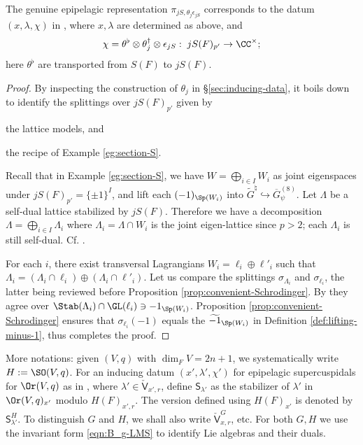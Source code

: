 \documentclass[a4paper,10pt]{article}
\begin{document}
\begin{lemma}\label{prop:chi-formula}
	The genuine epipelagic representation $\pi_{jS, \theta_j \epsilon_{jS}}$ corresponds to the datum $(x, \lambda, \chi)$ in \cite{LMS16}, where $x, \lambda$ are determined as above, and
	\[ \chi = \theta^\flat \otimes \theta_j^\dagger \otimes \epsilon_{jS}: \; jS(F)_{p'} \to \CC^\times; \]
	here $\theta^\flat$ are transported from $S(F)$ to $jS(F)$.
\end{lemma}
\begin{proof}
	By inspecting the construction of $\theta_j$ in \S\ref{sec:inducing-data}, it boils down to identify the splittings over $jS(F)_{p'}$ given by
	\begin{inparaenum}[(a)]
		\item the lattice models, and
		\item the recipe of Example \ref{eg:section-S}.
	\end{inparaenum}
	Recall that in Example \ref{eg:section-S}, we have $W = \bigoplus_{i \in I} W_i$ as joint eigenspaces under $jS(F)_{p'} = \{\pm 1\}^I$, and lift each $(-1)_{\Sp(W_i)}$ into $\tilde{G}^\natural \hookrightarrow \overline{G}^{(8)}_\psi$. Let $\Lambda$ be a self-dual lattice stabilized by $jS(F)$. Therefore we have a decomposition $\Lambda = \bigoplus_{i \in I} \Lambda_i$ where $\Lambda_i = \Lambda \cap W_i$ is the joint eigen-lattice since $p > 2$; each $\Lambda_i$ is still self-dual. Cf. \cite[p.551]{Li11}.

	For each $i$, there exist transversal Lagrangians $W_i = \ell_i \oplus \ell'_i$ such that $\Lambda_i = (\Lambda_i \cap \ell_i) \oplus (\Lambda_i \cap \ell'_i)$. Let us compare the splittings $\sigma_{\Lambda_i}$ and $\sigma_{\ell_i}$, the latter being reviewed before Proposition \ref{prop:convenient-Schrodinger}. By \cite[Proposition 2.13]{Li11} they agree over $\Stab(\Lambda_i) \cap \GL(\ell_i) \ni -1_{\Sp(W_i)}$. Proposition \ref{prop:convenient-Schrodinger} ensures that $\sigma_{\ell_i}(-1)$ equals the $\widetilde{-1}_{\Sp(W_i)}$ in Definition \ref{def:lifting-minus-1}, thus completes the proof.
\end{proof}

More notations: given $(V,q)$ with $\dim_F V = 2n+1$, we systematically write $H := \SO(V,q)$. For an inducing datum $(x', \lambda', \chi')$ for epipelagic supercuspidals for $\Or(V,q)$ as in \cite{LMS16}, where $\lambda' \in \check{\mathsf{V}}_{x',r}$, define $\mathsf{S}_{\lambda'}$ as the stabilizer of $\lambda'$ in $\Or(V,q)_{x'}$ modulo $H(F)_{x',r}$. The version defined using $H(F)_{x'}$ is denoted by $\mathsf{S}^H_{\lambda'}$. To distinguish $G$ and $H$, we shall also write $\check{\mathsf{V}}^G_{x,r}$, etc. For both $G, H$ we use the invariant form \eqref{eqn:B_g-LMS} to identify Lie algebras and their duals.
\end{document}
